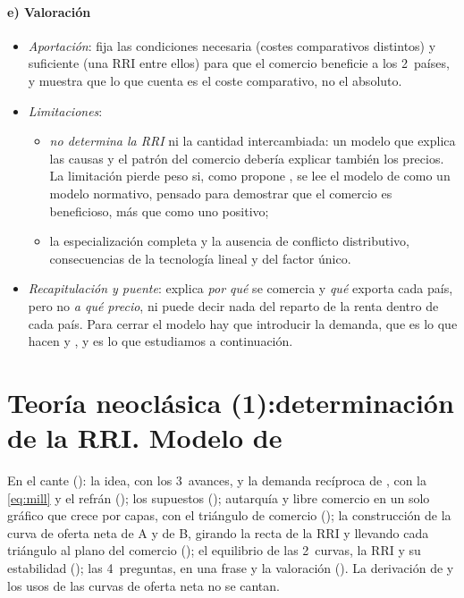 \documentclass[11pt]{article}
\begin{document}
\paragraph{e) Valoración}

\begin{itemize}
\item \emph{Aportación}: fija las condiciones necesaria (costes comparativos distintos) y suficiente (una RRI entre ellos) para que el comercio beneficie a los 2~países, y muestra que lo que cuenta es el coste comparativo, no el absoluto.
\item \emph{Limitaciones}:
  \begin{itemize}
  \item \emph{no determina la RRI} ni la cantidad intercambiada: un modelo que explica las causas y el patrón del comercio debería explicar también los precios. La limitación pierde peso si, como propone \textcite{Bhagwati1964Pure}, se lee el modelo de  como un modelo normativo, pensado para demostrar que el comercio es beneficioso, más que como uno positivo;
  \item la especialización completa y la ausencia de conflicto distributivo, consecuencias de la tecnología lineal y del factor único.
  \end{itemize}
\item \emph{Recapitulación y puente}:  explica \emph{por qué} se comercia y \emph{qué} exporta cada país, pero no \emph{a qué precio}, ni puede decir nada del reparto de la renta dentro de cada país. Para cerrar el modelo hay que introducir la demanda, que es lo que hacen  y , y es lo que estudiamos a continuación.
\end{itemize}

\section{Teoría neoclásica (1):\newline determinación de la RRI. Modelo de }\label{sec:neoclasico-rri}

\begin{notaopositor}
En el cante (): la idea, con los 3~avances,  y la demanda recíproca de , con la \eqref{eq:mill} y el refrán (); los supuestos (); autarquía y libre comercio en un solo gráfico que crece por capas, con el triángulo de comercio (); la construcción de la curva de oferta neta de A y de B, girando la recta de la RRI y llevando cada triángulo al plano del comercio (); el equilibrio de las 2~curvas, la RRI y su estabilidad (); las 4~preguntas,  en una frase y la valoración (). La derivación de  y los usos de las curvas de oferta neta no se cantan.
\end{notaopositor}
\end{document}
